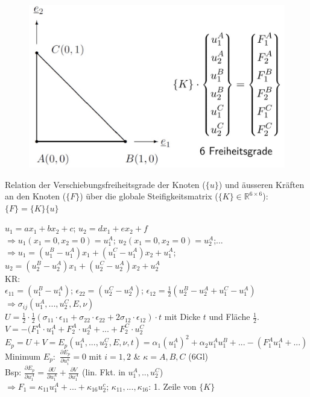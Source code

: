 \documentclass[a4paper,10pt]{article}
\begin{document}
\begin{multicols*}{3}
            \vspace{-2mm}
            \begin{figure}
                \includegraphics[width=\linewidth]{Dreieckselement}
            \end{figure}
            Relation der Verschiebungsfreiheitsgrade der Knoten ($\{u\}$) und äusseren Kräften an den Knoten ($\{F\}$) über die globale Steifigkeitsmatrix ($\{K\}\in\mathbb{R}^{6\times6}$): $\{F\}=\{K\}\{u\}$
            
            $u_1=ax_1+bx_2+c$; $u_2=dx_1+ex_2+f$\\
            $\Rightarrow u_1(x_1=0,x_2=0)=u_1^A$; $u_2(x_1=0,x_2=0)=u_2^A$;...\\
            $\Rightarrow u_1=(u_1^B-u_1^A)x_1+(u_1^C-u_1^A)x_2+u_1^A$;\\
            $u_2=(u_2^B-u_2^A)x_1+(u_2^C-u_2^A)x_2+u_2^A$\\
            KR:\\
            $\epsilon_{11}=(u_1^B-u_1^A)$; $\epsilon_{22}=(u_2^C-u_2^A)$; $\epsilon_{12}=\frac{1}{2}(u_2^B-u_2^A+u_1^C-u_1^A)$
            $\Rightarrow\sigma_{ij}(u_1^A,...,u_2^C,E,\nu)$\\
            $U=\frac{1}{2}\cdot\frac{1}{2}(\sigma_{11}\cdot\epsilon_{11}+\sigma_{22}\cdot\epsilon_{22}+2\sigma_{12}\cdot\epsilon_{12})\cdot t$ mit Dicke $t$ und Fläche $\frac{1}{2}$.\\
            $V=-(F_1^A\cdot u_1^A+F_2^A\cdot u_2^A+...+F_2^C\cdot u_2^C$\\
            $E_p=U+V=E_p(u_1^A,...,u_2^C,E,\nu,t)=\alpha_1(u_1^A)^2+\alpha_2u_1^Au_1^B+ ...-(F_1^Au_1^A+...)$\\
            Minimum $E_p:$ $\frac{\partial E_p}{\partial u_i^\kappa}=0$ mit $i=1,2$ \& $\kappa=A,B,C$ (6Gl)\\
            Bsp: $\frac{\partial E_p}{\partial u_1^A}=\frac{\partial U}{\partial u_1^A}+\frac{\partial V}{\partial u_1^A}$ (lin. Fkt. in $u_1^A,..,u_2^C$) \\$\Rightarrow F_1=\kappa_{11}u_1^A+...+\kappa_{16}u_2^c$; $\kappa_{11},...,\kappa_{16}$: 1. Zeile von $\{K\}$


\end{multicols*}
\end{document}
